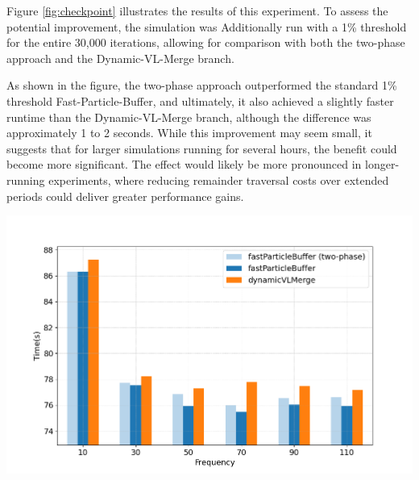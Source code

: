 Figure \ref{fig:checkpoint} illustrates the results of this experiment. To assess the potential improvement, the simulation was Additionally run with a 1\% threshold for the entire 30,000 iterations, allowing for comparison with both the two-phase approach and the Dynamic-VL-Merge branch.  

As shown in the figure, the two-phase approach outperformed the standard 1\% threshold Fast-Particle-Buffer, and ultimately, it also achieved a slightly faster runtime than the Dynamic-VL-Merge branch, although the difference was approximately 1 to 2 seconds. While this improvement may seem small, it suggests that for larger simulations running for several hours, the benefit could become more significant. The effect would likely be more pronounced in longer-running experiments, where reducing remainder traversal costs over extended periods could deliver greater performance gains.

\begin{center}
    \includegraphics[width=0.8\linewidth]{graphs/checkpoint.png}
    \captionsetup{hypcap=false}
    \label{fig:checkpoint}
\end{center}


